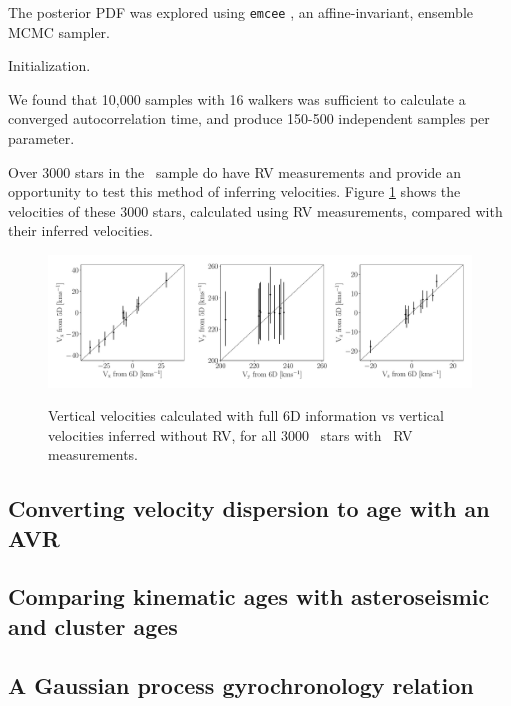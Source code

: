 The posterior PDF was explored using {\tt emcee} \citep{foreman-mackey2013},
an affine-invariant, ensemble MCMC sampler.

Initialization.

We found that 10,000 samples with 16 walkers was sufficient to calculate a
converged autocorrelation time, and produce 150-500 independent samples per
parameter.

Over 3000 stars in the \mct\ sample do have RV measurements and provide an
opportunity to test this method of inferring velocities.
Figure \ref{fig:v_comparison} shows the velocities of these 3000 stars,
calculated using RV measurements, compared with their inferred velocities.

\begin{figure}[ht!]
\caption{Vertical velocities calculated with full 6D information vs vertical
    velocities inferred without RV, for all 3000 \mct\ stars with \gaia\ RV
    measurements.}
  \centering
    \includegraphics[width=1\textwidth]{v_comparison}
\label{fig:v_comparison}
\end{figure}


\subsection{Converting velocity dispersion to age with an AVR}
\label{sec:avr}

\subsection{Comparing kinematic ages with asteroseismic and cluster ages}

\subsection{A Gaussian process gyrochronology relation}
\label{sec:gp_model}
